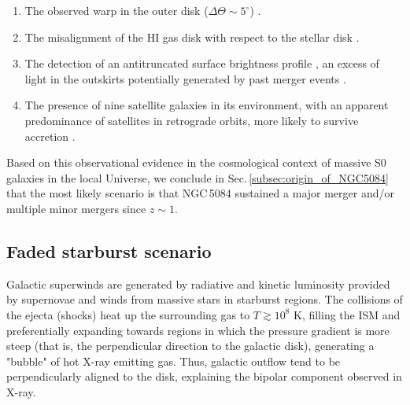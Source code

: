 \documentclass[modern]{CORE-AAS/aastex631}
\begin{document}
\begin{enumerate}
\item The observed warp in the outer disk ($\Delta\Theta\sim5^{\circ}$) \citep{zeilinger+1990mnras246_324}.

\item The misalignment of the HI gas disk with respect to the stellar disk \citep{gottesman+1986mnras219_759,zheng+2022afz22_085004}.
\item The detection of an antitruncated surface brightness profile \citep{comeron+2012apj759_98}, an excess of light in the outskirts potentially generated by past merger events \citep{younger+2007apj670_269, borlaff+2014aap570_103}.

\item The presence of nine satellite galaxies in its environment, with an apparent predominance of satellites in retrograde orbits, more likely to survive accretion \citep[see Fig.\,\ref{fig:NGC5084_environment}]{carignan+1997aj113_1585}.

\end{enumerate}

Based on this observational evidence in the cosmological context of massive S0 galaxies in the local Universe, we conclude in Sec.\,\ref{subsec:origin_of_NGC5084} that the most likely scenario is that NGC\,5084 sustained a major merger and/or multiple minor mergers since $z\sim1$.

\subsection{Faded starburst scenario}
\label{subsec:discussion_fadedstarburst}

Galactic superwinds \citep[][]{heckman+1993inproceedings_455} are generated by  radiative and kinetic luminosity provided by supernovae and winds from massive stars in starburst regions. The collisions of the ejecta (shocks) heat up the surrounding gas to $T\gtrsim10^{8}$ K, filling the ISM and preferentially expanding towards regions in which the pressure gradient is more steep (that is, the perpendicular direction to the galactic disk), generating a "bubble" of hot X-ray emitting gas. Thus, galactic outflow tend to be perpendicularly aligned to the disk, explaining the bipolar component observed in X-ray. 
\end{document}
